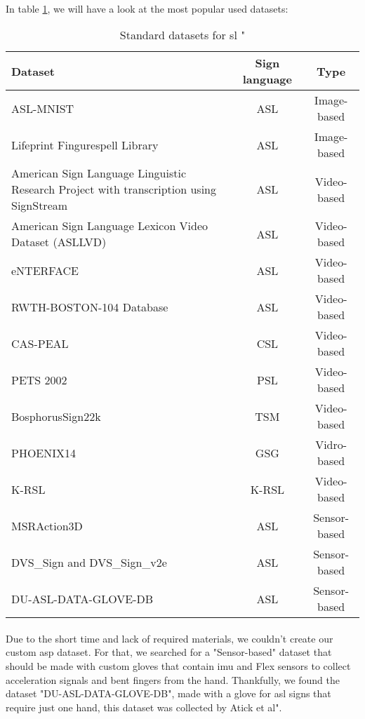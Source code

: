 \paragraph{}
In table \ref{tab:standard-datasets}, we will have a look at the most popular used datasets:
\begin{table}[h]
	\centering
	\caption{Standard datasets for \ac{sl} "\cite{state_of_the_art, ref-article, fingerspelling, wu2018american, baker2010sign, lu2008database, starner1995real, li2011framework, ozdemir2020bosphorussign22k}}
	\label{tab:standard-datasets}
	\begin{tabular}{|p{}|c|c|}
		\hline
		Dataset & Sign language & Type \\
		\hline
		ASL-MNIST & ASL & Image-based \\
		\hline
		Lifeprint Fingurespell Library & ASL & Image-based \\
		\hline
		American Sign Language Linguistic Research Project with transcription using SignStream & ASL & Video-based \\
		\hline
		American Sign Language Lexicon Video Dataset (ASLLVD) & ASL & Video-based \\
		\hline
		eNTERFACE & ASL & Video-based \\
		\hline
		RWTH-BOSTON-104 Database & ASL & Video-based \\
		\hline
		CAS-PEAL & CSL & Video-based \\
		\hline
		PETS 2002 & PSL & Video-based \\
		\hline
		BosphorusSign22k & TSM & Video-based \\
		\hline
		PHOENIX14 & GSG& Vidro-based \\
		\hline
		K-RSL & K-RSL & Video-based \\
		\hline
		MSRAction3D & ASL & Sensor-based \\
		\hline
		DVS\_Sign and DVS\_Sign\_v2e & ASL & Sensor-based \\
		\hline
		DU-ASL-DATA-GLOVE-DB & ASL & Sensor-based \\
		\hline
	\end{tabular}
\end{table}
\paragraph{}
Due to the short time and lack of required materials, we couldn't create our custom \ac{asp} dataset. For that, we searched for a "Sensor-based" dataset that should be made with custom gloves that contain \ac{imu} and Flex sensors to collect acceleration signals and bent fingers from the hand. Thankfully, we found the dataset "DU-ASL-DATA-GLOVE-DB", made with a glove for \ac{asl} signs that require just one hand, this dataset was collected by Atick et al"\cite{ref-article}.